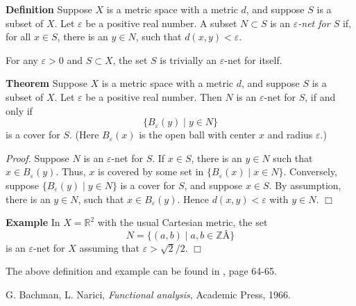 \documentclass[12pt]{article}
\begin{document}
{\bf Definition}
Suppose $X$ is a metric space with a metric $d$, and suppose
$S$ is a subset of $X$. Let $\varepsilon$ be a positive real number.
A subset $N\subset S$ is an $\varepsilon$\emph{-net
for $S$} if, for all $x\in S$, there is an $y\in N$,
such that $d(x,y)<\varepsilon$.

For any $\varepsilon>0$ and $S\subset X$, the set $S$ is trivially an 
$\varepsilon$-net for itself. 

{\bf Theorem} 
Suppose $X$ is a metric space with a metric $d$, and suppose
$S$ is a subset of $X$. Let $\varepsilon$ be a positive real number.
Then $N$ is an $\varepsilon$-net for $S$, if and only if
$$\{ B_\varepsilon(y) \mid y\in N \}$$
is a cover for $S$. (Here $B_\varepsilon(x)$ is
the open ball with center $x$ and radius $\varepsilon$.)

\emph{Proof.} Suppose $N$ is an $\varepsilon$-net for $S$. 
If $x\in S$, there is an $y\in N$ such that $x\in B_\varepsilon(y)$. 
Thus, $x$ is covered by some set in $\{ B_\varepsilon(x) \mid x\in N \}$.
Conversely, suppose $\{ B_\varepsilon(y) \mid y\in N \}$ is
a cover for $S$, and suppose $x\in S$. By assumption,
there is an $y\in N$, such that $x\in B_\varepsilon(y)$.
Hence $d(x,y)<\varepsilon$ with $y\in N$.
$\Box$

{\bf Example}
In $X=\mathbb{R}^2$ with the usual
Cartesian metric, the set
$$ N = \{(a,b) \mid a,b\in \mathbb{Z}Â \}$$
is an $\varepsilon$-net for $X$ assuming that
$\varepsilon> \sqrt{2}/2$. $\Box$

The above definition and example can be found in \cite{bachman}, page 64-65.

\begin{thebibliography}{9}
G. Bachman, L. Narici,
\emph{Functional analysis},
Academic Press, 1966.
\end{thebibliography}
\end{document}
